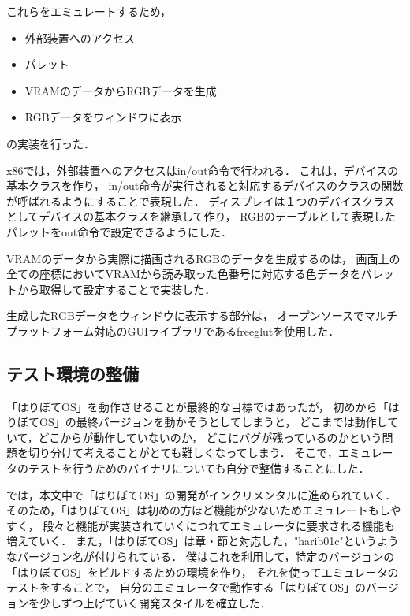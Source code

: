 \documentclass[10pt,a4j]{jsarticle}
\begin{document}
これらをエミュレートするため，
\begin{itemize}
	\item 外部装置へのアクセス
	\item パレット
	\item VRAMのデータからRGBデータを生成
	\item RGBデータをウィンドウに表示
\end{itemize}
の実装を行った．

x86では，外部装置へのアクセスはin/out命令で行われる．
これは，デバイスの基本クラスを作り，
in/out命令が実行されると対応するデバイスのクラスの関数が呼ばれるようにすることで表現した．
ディスプレイは１つのデバイスクラスとしてデバイスの基本クラスを継承して作り，
RGBのテーブルとして表現したパレットをout命令で設定できるようにした．

VRAMのデータから実際に描画されるRGBのデータを生成するのは，
画面上の全ての座標においてVRAMから読み取った色番号に対応する色データをパレットから取得して設定することで実装した．


生成したRGBデータをウィンドウに表示する部分は，
オープンソースでマルチプラットフォーム対応のGUIライブラリであるfreeglutを使用した．

\subsection{テスト環境の整備\label{impl-test-env}}

「はりぼてOS」を動作させることが最終的な目標ではあったが，
初めから「はりぼてOS」の最終バージョンを動かそうとしてしまうと，
どこまでは動作していて，どこからが動作していないのか，
どこにバグが残っているのかという問題を切り分けて考えることがとても難しくなってしまう．
そこで，エミュレータのテストを行うためのバイナリについても自分で整備することにした．

\cite{30days-osdev}では，本文中で「はりぼてOS」の開発がインクリメンタルに進められていく．
そのため，「はりぼてOS」は初めの方ほど機能が少ないためエミュレートもしやすく，
段々と機能が実装されていくにつれてエミュレータに要求される機能も増えていく．
また，「はりぼてOS」は章・節と対応した，"harib01c"というようなバージョン名が付けられている．
僕はこれを利用して，特定のバージョンの「はりぼてOS」をビルドするための環境を作り，
それを使ってエミュレータのテストをすることで，
自分のエミュレータで動作する「はりぼてOS」のバージョンを少しずつ上げていく開発スタイルを確立した．
\end{document}
